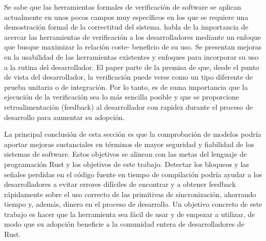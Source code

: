 Se sabe que las herramientas formales de verificación de software se aplican actualmente en
unos pocos campos muy específicos en los que se requiere una demostración formal de la correctitud
del sistema. \cite{reid:hatra:2020} habla de la importancia de acercar las herramientas de
verificación a los desarrolladores mediante un enfoque que busque maximizar la relación coste-
beneficio de su uso. Se presentan mejoras en la usabilidad de las herramientas existentes y
enfoques para incorporar su uso a la rutina del desarrollador. El paper parte de la premisa
de que, desde el punto de vista del desarrollador, la verificación puede verse como un tipo
diferente de prueba unitaria o de integración. Por lo tanto, es de suma importancia que la
ejecución de la verificación sea lo más sencilla posible y que se proporcione retroalimentación (feedback)
al desarrollador con rapidez durante el proceso de desarrollo para aumentar su adopción.

La principal conclusión de esta sección es que la comprobación de modelos podría aportar
mejoras sustanciales en términos de mayor seguridad y fiabilidad de los sistemas de software.
Estos objetivos se alinean con las metas del lenguaje de programación Rust y los objetivos de
este trabajo. Detectar los bloqueos y las señales perdidas en el código fuente en tiempo de
compilación podría ayudar a los desarrolladores a evitar errores difíciles de encontrar y a
obtener feedback rápidamente sobre el uso correcto de las primitivas de sincronización, ahorrando
tiempo y, además, dinero en el proceso de desarrollo. Un objetivo concreto de este trabajo es
hacer que la herramienta sea fácil de usar y de empezar a utilizar, de modo que su adopción
beneficie a la comunidad entera de desarrolladores de Rust.